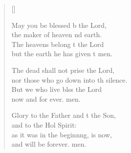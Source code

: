 \begin{verse}[\versewidth]
\begin{patverse}
May you be blessed b the Lord,\Med\\
the maker of heaven nd earth.\\
The heavens belong t the Lord\Med\\
but the earth he has given t men.

The dead shall not prise the Lord,\Med\\
nor those who go down into th silence.\\
But we who live blss the Lord\Med\\
now and for ever. men.

Glory to the Father and t the Son,\Med\\
and to the Hol Spirit:\\
as it was in the beginn\pointup{\i}ng, is now,\Med\\
and will be forever. men. 
  \end{patverse}
\end{verse}
